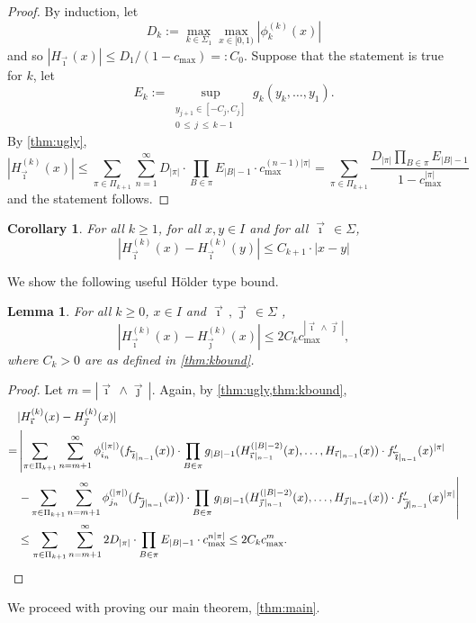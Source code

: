 \documentclass[12pt,]{article}
\newtheorem{corollary}[theorem]{Corollary}
\newtheorem{lemma}[theorem]{Lemma}
\theoremstyle{definition}
\theoremstyle{remark}
\newcommand{\0}{\mathbf{0}}
\newcommand{\cev}[1]{\reflectbox{\ensuremath{\vec{\reflectbox{\ensuremath{#1}}}}}}
\newcommand{\bi}{\vec{\imath}\,}
\newcommand{\bj}{\vec{\jmath}\,}
\newcommand{\bbi}{\,\cev{\imath}}
\newcommand{\bbj}{\,\cev{\jmath}}
\begin{document}
\begin{proof}
  By induction, let 
  \[
    D_k:=\max_{k\in\Sigma_1}\max_{x\in[0,1)} |\phi_k^{(k)}(x)|
  \]
  and so
  $|H_{\bi}(x)| \leq D_1/(1-c_{\max})=:C_0$.
  Suppose that the statement is true for $k$, let 
  \[
    E_k:= \sup_{\substack{y_{j+1}\in[-C_j,C_j]\\0\,\leq\, j \,\leq\, k-1}}g_k(y_k,\dots,y_1).
  \]
  By \cref{thm:ugly},
  \[
    |H_{\bi}^{(k)}(x)| \leq \sum_{\pi\in\Pi_{k+1}}\sum_{n=1}^\infty D_{|\pi|} \cdot \prod_{B\in\pi}
    E_{|B|-1} \cdot c_{\max}^{(n-1)|\pi|}
    = \sum_{\pi\in\Pi_{k+1}} \frac{D_{|\pi|}\prod_{B\in\pi}E_{|B|-1}}{1-c_{\max}^{|\pi|}}
  \]
  and the statement follows.
\end{proof}
\begin{corollary}
  \label{thm:difcor}
  For all $k\geq 1$, for all $x,y\in I$ and for all $\bi\in\Sigma$,
  \[
    |H_{\bi}^{(k)}(x) - H_{\bi}^{(k)}(y)| \leq C_{k+1}\cdot |x-y|
  \]
\end{corollary}
We show the following useful H\"older type bound.
\begin{lemma}\label{thm:difbound}
  For all $k\geq 0$, $x\in I$ and $\bi,\bj\in\Sigma$ ,
  \[
    |H_{\bi}^{(k)}(x) - H_{\bj}^{(k)}(x)| \leq 2C_k c_{\max}^{|\bi\wedge\bj|},
  \]
  where $C_k>0$ are as defined in \cref{thm:kbound}.
\end{lemma}
\begin{proof}
  Let $m = |\bi\wedge\bj|$. Again, by \cref{thm:ugly,thm:kbound},
  \begin{align}
    &|H_{\bi}^{(k)}(x) - H_{\bj}^{(k)}(x)| 
    \nonumber\\
    =&
    \left|
    \sum_{\pi\in\Pi_{k+1}}\sum_{n=m+1}^\infty \phi_{i_n}^{(|\pi|)}(f_{\bbi|_{n-1}}(x))\cdot
    \prod_{B\in\pi} g_{|B|-1}(H_{\bi|_{n-1}}^{(|B|-2)}(x),\dots,H_{\bi|_{n-1}}(x)) \cdot
    f_{\bbi|_{n-1}}'(x)^{|\pi|}
  \right.
  \nonumber\\
     &
     \left. -
       \sum_{\pi\in\Pi_{k+1}}\sum_{n=m+1}^\infty \phi_{j_n}^{(|\pi|)}(f_{\bbj|_{n-1}}(x))\cdot
       \prod_{B\in\pi} g_{|B|-1}(H_{\bj|_{n-1}}^{(|B|-2)}(x),\dots,H_{\bj|_{n-1}}(x)) \cdot
       f_{\bbj|_{n-1}}'(x)^{|\pi|}
       \right|\nonumber\\
     &\leq
     \sum_{\pi\in\Pi_{k+1}}\sum_{n=m+1}^\infty 2D_{|\pi|}\cdot \prod_{B\in\pi} E_{|B|-1}
     \cdot c_{\max}^{n|\pi|} \leq 2 C_{k} c_{\max}^m.\nonumber
     \qedhere
  \end{align}
\end{proof}
We proceed with proving our main theorem, \cref{thm:main}.
\end{document}
